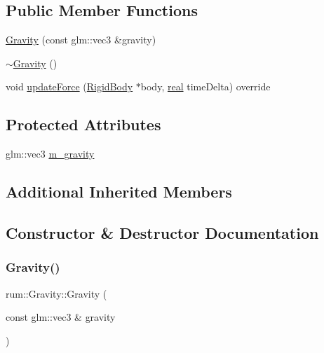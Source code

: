\subsection*{Public Member Functions}
\begin{DoxyCompactItemize}
\item 
\mbox{\hyperlink{classrum_1_1_gravity_a9fca05b6d906fec4c40507b0c738dff8}{Gravity}} (const glm\+::vec3 \&gravity)
\item 
\mbox{\hyperlink{classrum_1_1_gravity_a67fc63876df40007e8c7bde5e8a72569}{$\sim$\+Gravity}} ()
\item 
void \mbox{\hyperlink{classrum_1_1_gravity_abf5ce00e3e2e924a086ada82fc9d1404}{update\+Force}} (\mbox{\hyperlink{classrum_1_1_rigid_body}{Rigid\+Body}} $\ast$body, \mbox{\hyperlink{namespacerum_a7e8cca23573d5eaead0f138cbaa4862c}{real}} time\+Delta) override
\end{DoxyCompactItemize}
\subsection*{Protected Attributes}
\begin{DoxyCompactItemize}
\item 
glm\+::vec3 \mbox{\hyperlink{classrum_1_1_gravity_a82c9f64363024c45e96ba851a612613b}{m\+\_\+gravity}}
\end{DoxyCompactItemize}
\subsection*{Additional Inherited Members}


\subsection{Constructor \& Destructor Documentation}
\mbox{\label{classrum_1_1_gravity_a9fca05b6d906fec4c40507b0c738dff8}} 
\subsubsection{\texorpdfstring{Gravity()}{Gravity()}}
{\footnotesize\ttfamily rum\+::\+Gravity\+::\+Gravity (\begin{DoxyParamCaption}\item[{const glm\+::vec3 \&}]{gravity }\end{DoxyParamCaption})\hspace{0.3cm}{\ttfamily [explicit]}}

